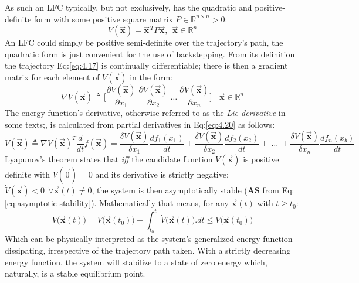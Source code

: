 As such an LFC typically, but not exclusively, has the quadratic and positive-definite form with some positive square matrix $P\in\mathbb{R}^{n\times n}>0$:
\begin{equation}
V(\vec{\mathbf{x}})=\vec{\mathbf{x}}\hspace{1pt}^TP\vec{\mathbf{x}},~~\vec{\mathbf{x}}\in\mathbb{R}^{n}
\end{equation}
An LFC could simply be positive semi-definite over the trajectory's path, the quadratic form is just convenient for the use of backstepping. From its definition the trajectory Eq:\ref{eq:4.17} is continually differentiable; there is then a gradient matrix for each element of $V(\vec{\mathbf{x}})$ in the form:
\begin{equation}\label{eq:4.20}
\nabla V(\vec{\mathbf{x}})\triangleq\bigg[\frac{\partial V(\vec{\mathbf{x}})}{\partial x_1}~\frac{\partial V(\vec{\mathbf{x}})}{\partial x_2}~\ldots~\frac{\partial V(\vec{\mathbf{x}})}{\partial x_n}\bigg]~~~~\vec{\mathbf{x}}\in\mathbb{R}^n
\end{equation}
The energy function's derivative, otherwise referred to as the \emph{Lie derivative} in some texts;\cite{noteonlyapunov,nonlinearsystems}, is calculated from partial derivatives in Eq:\ref{eq:4.20} as follows:
\begin{equation}
\dot{V}(\vec{\mathbf{x}})\triangleq\nabla V(\vec{\mathbf{x}})^T\frac{d}{dt}f(\vec{\mathbf{x}})=\frac{\delta V(\vec{\mathbf{x}})}{\delta x_1}\frac{df_1(x_1)}{dt}+\frac{\delta V(\vec{\mathbf{x}})}{\delta x_2}\frac{df_2(x_2)}{dt}+~\ldots~+\frac{\delta V(\vec{\mathbf{x}})}{\delta x_n}\frac{df_n(x_b)}{dt}
\end{equation}
Lyapunov's theorem states that \emph{iff} the candidate function $V(\vec{\mathbf{x}})$ is positive definite with $V(\vec{0})=0$ and its derivative is strictly negative; $\dot{V}(\vec{\mathbf{x}})< 0~~\forall \vec{\mathbf{x}}(t) \not= 0$, the system is then asymptotically stable ($\mathbf{AS}$ from Eq:\ref{eq:asymptotic-stability}). Mathematically that means, for any $\vec{\mathbf{x}}(t)$ with $t\geq t_0$:
\begin{equation}\label{eq:4.22}
V\big(\vec{\mathbf{x}}(t)\big)=V\big(\vec{\mathbf{x}}(t_0)\big)+\int_{t_0}^t \dot{V}\big(\vec{\mathbf{x}}(t)\big).dt \leq V\big(\vec{\mathbf{x}}(t_0)\big)
\end{equation}
Which can be physically interpreted as the system's generalized energy function dissipating, irrespective of the trajectory path taken. With a strictly decreasing energy function, the system will stabilize to a state of zero energy which, naturally, is a stable equilibrium point.
